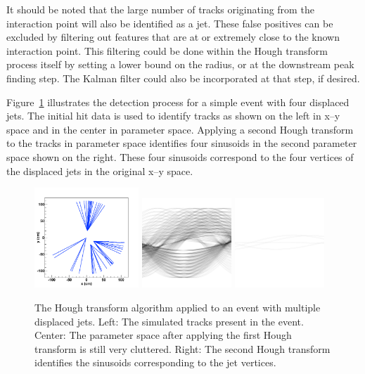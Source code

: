 \documentclass{JINST}
\begin{document}
It should be noted that the large number of tracks originating from the interaction point will also be identified as a jet.  These false positives can be excluded by filtering out features that are at or extremely close to the known interaction point.  This filtering could be done within the Hough transform process itself by setting a lower bound on the radius, or at the downstream peak finding step. The Kalman filter could also be incorporated at that step, if desired.

Figure~\ref{fig:DisplacedJets} illustrates the detection process for a simple event with four displaced jets.  The initial hit data is used to identify tracks as shown on the left in x--y space and in the center in parameter space.  Applying a second Hough transform to the tracks in parameter space identifies four sinusoids in the second parameter space shown on the right.  These four sinusoids correspond to the four vertices of the displaced jets in the original x--y space.

\begin{figure}[!Hhtb]
\begin{center}
	\includegraphics[width=0.35\textwidth]{figs/jet2/tracks.pdf}
	\includegraphics[width=0.30\textwidth]{figs/jet2/accumulator.pdf}
	\includegraphics[width=0.30\textwidth]{figs/jet2/vertex.pdf}
	\caption{The Hough transform algorithm applied to an event with multiple displaced jets. Left: The simulated
	tracks present in the event. Center: The parameter space after applying the first Hough transform is still very
	cluttered. Right: The second Hough transform identifies the sinusoids corresponding to the jet vertices.
	\label{fig:DisplacedJets}}
\end{center}
\end{figure}
\end{document}
